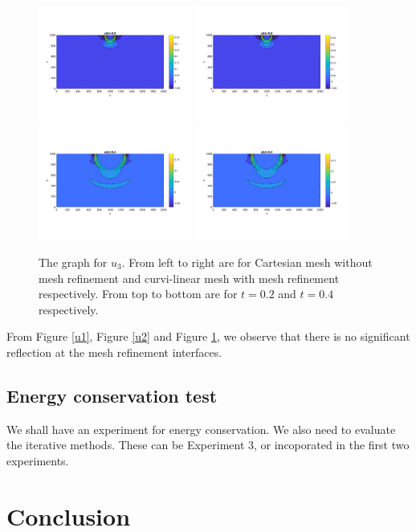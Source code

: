 \documentclass[a4paper]{article}
\begin{document}
\begin{figure}[H]
	\centering
	\includegraphics[width=0.45\textwidth]{u3_t02_cartesian.png}
	\includegraphics[width=0.45\textwidth]{u3_t02_curvi_mr.png}\\
	\includegraphics[width=0.45\textwidth]{u3_t04_cartesian.png}
	\includegraphics[width=0.45\textwidth]{u3_t04_curvi_mr.png}
	\caption{\scriptsize{The graph for $u_3$. From left to right are for Cartesian mesh without mesh refinement and curvi-linear mesh with mesh refinement respectively. From top to bottom are for $t = 0.2$ and $t = 0.4$ respectively.}}\label{u3}
\end{figure}
From Figure \ref{u1}, Figure \ref{u2} and Figure \ref{u3}, we observe that there is no significant reflection at the mesh refinement interfaces.

\subsection{Energy conservation test}\label{conserved_energy}
We shall have an experiment for energy conservation. We also need to evaluate the iterative methods. These can be Experiment 3, or incoporated in the first two experiments.

\section{Conclusion}
\end{document}
